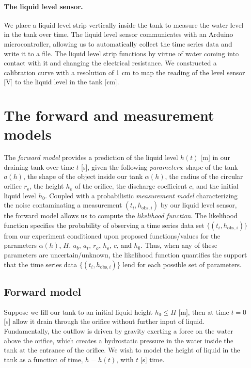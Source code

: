 \documentclass[openacc]{rsproca_new}%
\begin{document}
\paragraph{The liquid level sensor.} We place a liquid level strip vertically inside the tank to measure the water level in the tank over time. The liquid level sensor communicates with an Arduino microcontroller, allowing us to automatically collect the time series data and write it to a file. The liquid level strip functions by virtue of water coming into contact with it and changing the electrical resistance. 
We constructed a calibration curve with a resolution of 1 cm to map the reading of the level sensor [V] to the liquid level in the tank [cm]. 

\section{The forward and measurement models}
The \emph{forward model} provides a prediction of the liquid level $h(t)$ [m] in our draining tank over time $t$ [s], given the following \emph{parameters}: shape of the tank $a(h)$, the shape of the object inside our tank $\alpha(h)$, the radius of the circular orifice $r_o$, the height $h_o$ of the orifice, the discharge coefficient $c$, and the initial liquid level $h_0$. 
Coupled with a probabilistic \emph{measurement model} characterizing the noise contaminating a measurement $(t_i, h_{\text{obs}, i})$ by our liquid level sensor, the forward model allows us to compute the \emph{likelihood function}. The likelihood function specifies the probability of observing a time series data set $\{(t_i, h_{\text{obs}, i})\}$ from our experiment conditioned upon proposed functions/values for the parameters $\alpha(h)$, $H$, $a_b$, $a_t$, $r_o$, $h_o$, $c$, and $h_0$. Thus, when any of these parameters are uncertain/unknown, the likelihood function quantifies the support that the time series data $\{(t_i, h_{\text{obs}, i})\}$ lend for each possible set of parameters.

\subsection{Forward model}
Suppose we fill our tank to an initial liquid height $h_0 \leq H$ [m], then at time $t=0$ [s] allow it drain through the orifice without further input of liquid. Fundamentally, the outflow is driven by gravity exerting a force on the water above the orifice, which creates a hydrostatic pressure in the water inside the tank at the entrance of the orifice. 
We wish to model the height of liquid in the tank as a function of time, $h=h(t)$, with $t$ [s] time. 
\end{document}
